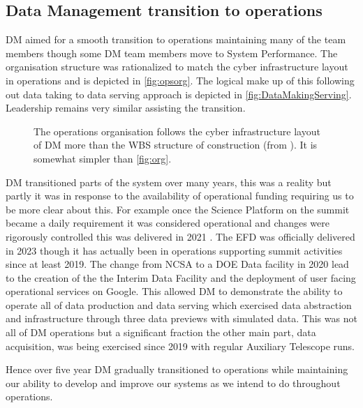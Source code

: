 \subsection{ Data Management transition to operations} \label{sec:transition}

DM aimed for a smooth transition to operations maintaining many of the team members though some DM team members move to System Performance.
The organisation structure was rationalized to match the cyber infrastructure layout in operations and is depicted in \autoref{fig:opsorg}.
The logical make up of this following out data taking to data serving approach is depicted in \autoref{fig:DataMakingServing}.
Leadership remains very similar assisting the transition.

\begin{figure*}[ht]
\caption{ The operations organisation follows the cyber infrastructure layout of DM more than the WBS structure of construction (from \cite{RTN-046}).
 It is somewhat simpler than \autoref{fig:org}.  \label{fig:opsorg}}
\end{figure*}


DM transitioned parts of the system over many years, this was a reality  but partly it was in response to the availability of operational funding requiring us to be more clear about this.
For example once the Science Platform on the summit became a daily requirement it was considered operational and changes were rigorously controlled
this was delivered in 2021 \citep{RTN-019}.
The EFD was officially delivered in 2023 though it has actually been in operations supporting summit activities  since at least 2019.
The change from NCSA to a DOE Data facility in 2020 lead to the creation of the the Interim Data Facility  and the deployment of user facing operational services on Google\citep{2021arXiv211115030O}.
This allowed DM to demonstrate the ability to operate all  of data production and  data serving  which exercised data abstraction and infrastructure through three data previews with simulated data.
This was not all of DM operations but a significant fraction the other main part, data acquisition, was being exercised since 2019 with regular Auxiliary Telescope runs.

Hence over five year DM gradually transitioned to operations while maintaining our ability to develop and improve our systems as we intend to do throughout operations.

